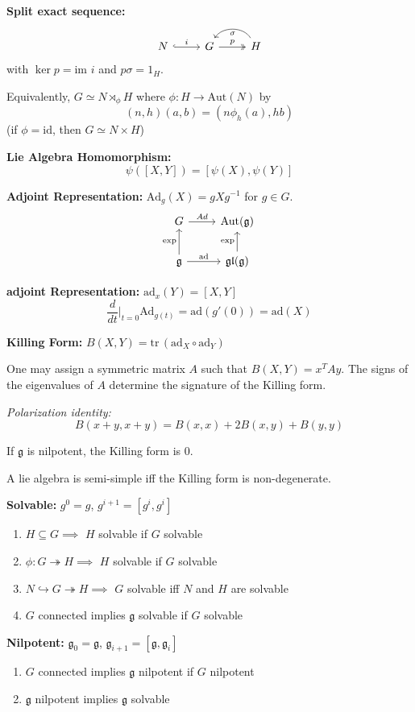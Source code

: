 \documentclass[12pt]{article}
\newcommand{\tr}{\text{tr}\,}
\newcommand{\g}{\mathfrak{g}}
\newcommand{\gl}{\mathfrak{gl}}
\newcommand{\Ad}{\text{Ad}}
\newcommand{\ad}{\text{ad}}
\newcommand{\Aut}{\text{Aut}}
\begin{document}
\begin{multicols}{2}
\textbf{Split exact sequence:}
\[\begin{tikzcd}
    N \arrow[hook, "i"]{r} & G \arrow[two heads, "p"]{r} & H \arrow[bend right=60, "\sigma"]{l}
\end{tikzcd}\]
with $\ker p = \text{im } i$ and $p\sigma = 1_H$.

Equivalently, $G \simeq N \rtimes_{\phi} H$ where $\phi: H \to \Aut(N)$ by 
\[(n, h)(a, b) = (n\phi_h(a), hb)\]
(if $\phi = \text{id}$, then $G \simeq N \times H$)

\textbf{Lie Algebra Homomorphism:}
\[\psi([X, Y]) = [\psi(X), \psi(Y)]\]

\textbf{Adjoint Representation:} $\Ad_g(X) = gXg^{-1}$ for $g \in G$. 
\[\begin{tikzcd}
    G \arrow["Ad"]{r} & \Aut(\g)\\ 
    \g \arrow["\ad"]{r} \arrow["\exp"]{u} & \gl(\g) \arrow["\exp"]{u}
\end{tikzcd}\]

\textbf{adjoint Representation:} $\ad_x(Y) = [X, Y]$
\[\frac{d}{dt}\bigg\vert_{t=0} \Ad_{g(t)} = \ad(g'(0)) = \ad(X)\]

\textbf{Killing Form:} $B(X, Y) = \tr(\ad_X \circ \ad_Y)$ 

One may assign a symmetric matrix $A$ such that $B(X, Y) =  x^TAy$. The signs of the eigenvalues of $A$ determine the signature of the Killing form.

\emph{Polarization identity:} 
\[B(x + y, x + y) = B(x, x) + 2B(x, y) + B(y, y)\]

If $\g$ is nilpotent, the Killing form is $0$. 

A lie algebra is semi-simple iff the Killing form is non-degenerate. 

\textbf{Solvable:} $g^0 = g$, $g^{i+1} = [g^i, g^i]$
\begin{enumerate}
    \item $H \subseteq G \implies$ $H$ solvable if $G$ solvable 
    \item $\phi: G \twoheadrightarrow H \implies$ $H$ solvable if $G$ solvable 
    \item $N \hookrightarrow G \twoheadrightarrow H \implies$ $G$ solvable iff $N$ and $H$ are solvable  
    \item $G$ connected implies $\g$ solvable if $G$ solvable 
\end{enumerate}

\textbf{Nilpotent:} $\g_0 = \g$, $\g_{i+1} = [\g, \g_i]$
\begin{enumerate}
    \item $G$ connected implies $\g$ nilpotent if $G$ nilpotent
    \item $\g$ nilpotent implies $\g$ solvable
\end{enumerate}


\end{multicols}
\end{document}
